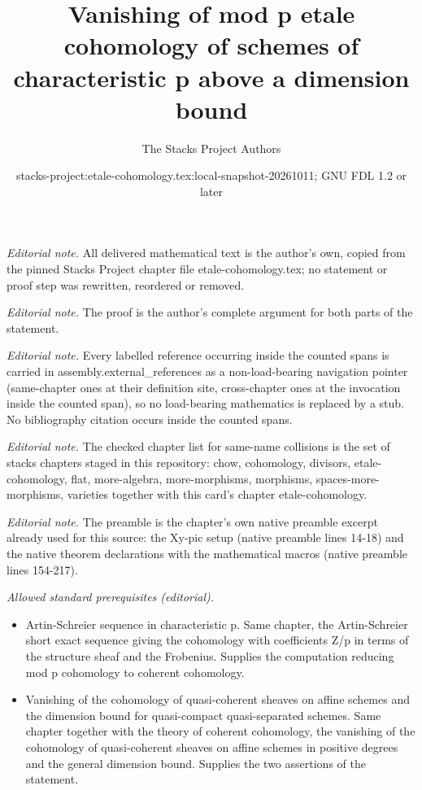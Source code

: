 \documentclass[10pt,a4paper]{amsart}
\title{Vanishing of mod p etale cohomology of schemes of characteristic p above a dimension bound}
\author{The Stacks Project Authors}
\date{stacks-project:etale-cohomology.tex:local-snapshot-20261011; GNU FDL 1.2 or later}
\theoremstyle{plain}
\theoremstyle{definition}
\theoremstyle{remark}
\numberwithin{equation}{subsection}
\begin{document}
\maketitle
\noindent\textit{Editorial note.} All delivered mathematical text is the author's own, copied from the pinned Stacks Project chapter file etale-cohomology.tex; no statement or proof step was rewritten, reordered or removed.\par\medskip
\noindent\textit{Editorial note.} The proof is the author's complete argument for both parts of the statement.\par\medskip
\noindent\textit{Editorial note.} Every labelled reference occurring inside the counted spans is carried in assembly.external\_references as a non-load-bearing navigation pointer (same-chapter ones at their definition site, cross-chapter ones at the invocation inside the counted span), so no load-bearing mathematics is replaced by a stub. No bibliography citation occurs inside the counted spans.\par\medskip
\noindent\textit{Editorial note.} The checked chapter list for same-name collisions is the set of stacks chapters staged in this repository: chow, cohomology, divisors, etale-cohomology, flat, more-algebra, more-morphisms, morphisms, spaces-more-morphisms, varieties together with this card's chapter etale-cohomology.\par\medskip
\noindent\textit{Editorial note.} The preamble is the chapter's own native preamble excerpt already used for this source: the Xy-pic setup (native preamble lines 14-18) and the native theorem declarations with the mathematical macros (native preamble lines 154-217).\par\medskip
\noindent\textit{Allowed standard prerequisites (editorial).}\begin{itemize}
\item Artin-Schreier sequence in characteristic p. Same chapter, the Artin-Schreier short exact sequence giving the cohomology with coefficients Z/p in terms of the structure sheaf and the Frobenius. Supplies the computation reducing mod p cohomology to coherent cohomology.
\item Vanishing of the cohomology of quasi-coherent sheaves on affine schemes and the dimension bound for quasi-compact quasi-separated schemes. Same chapter together with the theory of coherent cohomology, the vanishing of the cohomology of quasi-coherent sheaves on affine schemes in positive degrees and the general dimension bound. Supplies the two assertions of the statement.
\end{itemize}\medskip
\end{document}
